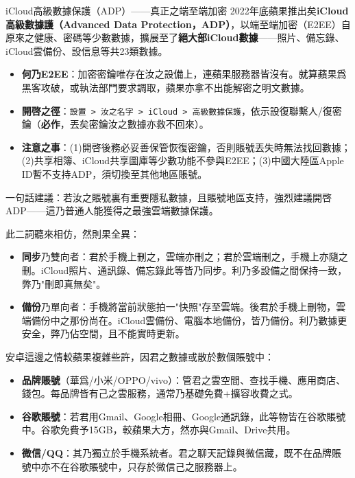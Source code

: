 \begin{tcbwarn}{iCloud高級數據保護（ADP）——真正之端至端加密}
2022年底蘋果推出矣\textbf{iCloud高級數據護（Advanced Data Protection，ADP）}，以端至端加密（E2EE）自原來之健康、密碼等少數數據，擴展至了\textbf{絕大部iCloud數據}——照片、備忘錄、iCloud雲備份、設信息等共23類數據。

\begin{itemize}
  \item \textbf{何乃E2EE}：加密密鑰唯存在汝之設備上，連蘋果服務器皆沒有。就算蘋果爲黑客攻破，或執法部門要求調取，蘋果亦拿不出能解密之明文數據。
  \item \textbf{開啓之徑}：\texttt{設置 > 汝之名字 > iCloud > 高級數據保護}，依示設復聯繫人/復密鑰（\textbf{必作}，丟矣密鑰汝之數據亦救不回來）。
  \item \textbf{注意之事}：(1)開啓後務必妥善保管恢復密鑰，否則賬號丟失時無法找回數據；(2)共享相簿、iCloud共享圖庫等少數功能不參與E2EE；(3)中國大陸區Apple ID暫不支持ADP，須切換至其他地區賬號。
\end{itemize}

一句話建議：若汝之賬號裏有重要隱私數據，且賬號地區支持，強烈建議開啓ADP——這乃普通人能獲得之最強雲端數據保護。

\end{tcbwarn}


此二詞聽來相仿，然則果全異：

\begin{itemize}
  \item \textbf{同步}乃雙向者：君於手機上刪之，雲端亦刪之；君於雲端刪之，手機上亦隨之刪。iCloud照片、通訊錄、備忘錄此等皆乃同步。利乃多設備之間保持一致，弊乃"刪即真無矣"。
  \item \textbf{備份}乃單向者：手機將當前狀態拍一"快照"存至雲端。後君於手機上刪物，雲端備份中之那份尚在。iCloud雲備份、電腦本地備份，皆乃備份。利乃數據更安全，弊乃佔空間，且不能實時更新。
\end{itemize}


安卓這邊之情較蘋果複雜些許，因君之數據或散於數個賬號中：

\begin{itemize}
  \item \textbf{品牌賬號}（華爲/小米/OPPO/vivo）：管君之雲空間、查找手機、應用商店、錢包。每品牌皆有己之雲服務，通常乃基礎免費+擴容收費之式。
  \item \textbf{谷歌賬號}：若君用Gmail、Google相冊、Google通訊錄，此等物皆在谷歌賬號中。谷歌免費予15GB，較蘋果大方，然亦與Gmail、Drive共用。
  \item \textbf{微信/QQ}：其乃獨立於手機系統者。君之聊天記錄與微信藏，既不在品牌賬號中亦不在谷歌賬號中，只存於微信己之服務器上。
\end{itemize}

